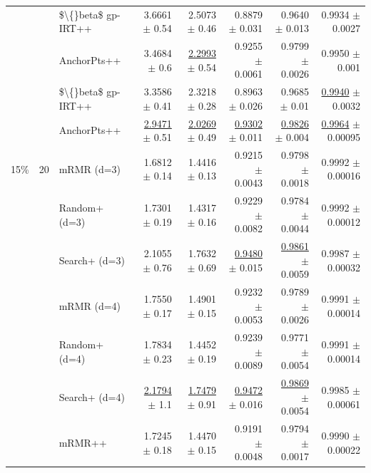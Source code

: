 \begin{longtable}{llp{}rrrrr}
 &  & \$\textbackslash\{\}beta\$ gp-IRT++ & 3.6661 {\scriptsize $\pm$ 0.54} & 2.5073 {\scriptsize $\pm$ 0.46} & 0.8879 {\scriptsize $\pm$ 0.031} & 0.9640 {\scriptsize $\pm$ 0.013} & 0.9934 {\scriptsize $\pm$ 0.0027} \\
 &  & AnchorPts++ & 3.4684 {\scriptsize $\pm$ 0.6} & \underline{2.2993} {\scriptsize $\pm$ 0.54} & 0.9255 {\scriptsize $\pm$ 0.0061} & 0.9799 {\scriptsize $\pm$ 0.0026} & 0.9950 {\scriptsize $\pm$ 0.001} \\
 &  & \$\textbackslash\{\}beta\$ gp-IRT++ & 3.3586 {\scriptsize $\pm$ 0.41} & 2.3218 {\scriptsize $\pm$ 0.28} & 0.8963 {\scriptsize $\pm$ 0.026} & 0.9685 {\scriptsize $\pm$ 0.01} & \underline{0.9940} {\scriptsize $\pm$ 0.0032} \\
 &  & AnchorPts++ & \underline{2.9471} {\scriptsize $\pm$ 0.51} & \underline{2.0269} {\scriptsize $\pm$ 0.49} & \underline{0.9302} {\scriptsize $\pm$ 0.011} & \underline{0.9826} {\scriptsize $\pm$ 0.004} & \underline{0.9964} {\scriptsize $\pm$ 0.00095} \\
\midrule
15\% & 20 & mRMR (d=3) & 1.6812 {\scriptsize $\pm$ 0.14} & 1.4416 {\scriptsize $\pm$ 0.13} & 0.9215 {\scriptsize $\pm$ 0.0043} & 0.9798 {\scriptsize $\pm$ 0.0018} & 0.9992 {\scriptsize $\pm$ 0.00016} \\
 &  & Random+ (d=3) & 1.7301 {\scriptsize $\pm$ 0.19} & 1.4317 {\scriptsize $\pm$ 0.16} & 0.9229 {\scriptsize $\pm$ 0.0082} & 0.9784 {\scriptsize $\pm$ 0.0044} & 0.9992 {\scriptsize $\pm$ 0.00012} \\
 &  & Search+ (d=3) & 2.1055 {\scriptsize $\pm$ 0.76} & 1.7632 {\scriptsize $\pm$ 0.69} & \underline{0.9480} {\scriptsize $\pm$ 0.015} & \underline{0.9861} {\scriptsize $\pm$ 0.0059} & 0.9987 {\scriptsize $\pm$ 0.00032} \\
 &  & mRMR (d=4) & 1.7550 {\scriptsize $\pm$ 0.17} & 1.4901 {\scriptsize $\pm$ 0.15} & 0.9232 {\scriptsize $\pm$ 0.0053} & 0.9789 {\scriptsize $\pm$ 0.0026} & 0.9991 {\scriptsize $\pm$ 0.00014} \\
 &  & Random+ (d=4) & 1.7834 {\scriptsize $\pm$ 0.23} & 1.4452 {\scriptsize $\pm$ 0.19} & 0.9239 {\scriptsize $\pm$ 0.0089} & 0.9771 {\scriptsize $\pm$ 0.0054} & 0.9991 {\scriptsize $\pm$ 0.00014} \\
 &  & Search+ (d=4) & \underline{2.1794} {\scriptsize $\pm$ 1.1} & \underline{1.7479} {\scriptsize $\pm$ 0.91} & \underline{0.9472} {\scriptsize $\pm$ 0.016} & \underline{0.9869} {\scriptsize $\pm$ 0.0054} & 0.9985 {\scriptsize $\pm$ 0.00061} \\
 &  & mRMR++ & 1.7245 {\scriptsize $\pm$ 0.18} & 1.4470 {\scriptsize $\pm$ 0.15} & 0.9191 {\scriptsize $\pm$ 0.0048} & 0.9794 {\scriptsize $\pm$ 0.0017} & 0.9990 {\scriptsize $\pm$ 0.00022} \\

\end{longtable}
